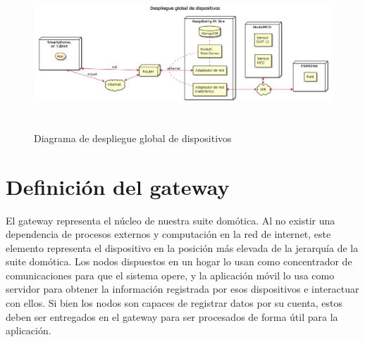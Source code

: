 \begin{figure}[hbt!]
\label{globalsystemdeployment}
\centering
\includegraphics[height=2.2in]{figures/diagrams/physical-devices/global.png}
\caption[Diagrama de despiegue global de dispositivos]{Diagrama de despliegue global de dispositivos\footnotemark}
\end{figure}


\section{Definición del gateway}
\label{ch:Capitulo4.2}

El \gls{gateway} representa el núcleo de nuestra suite domótica. Al no existir una dependencia de procesos externos y computación en la red de internet, este elemento representa el dispositivo en la posición más elevada de la jerarquía de la suite domótica. Los nodos dispuestos en un hogar lo usan como concentrador de comunicaciones para que el sistema opere, y la aplicación móvil lo usa como servidor para obtener la información registrada por esos dispositivos e interactuar con ellos. Si bien los nodos son capaces de registrar datos por su cuenta, estos deben ser entregados en el \gls{gateway} para ser procesados de forma útil para la aplicación.

\vspace{1cm}

